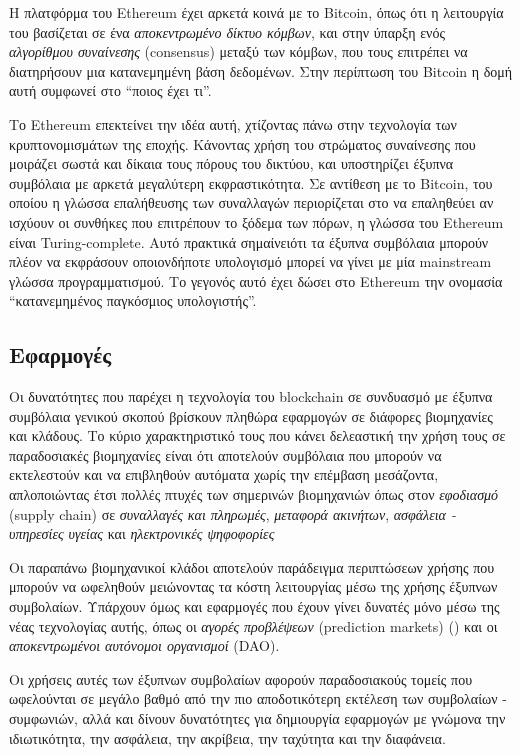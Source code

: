 Η πλατφόρμα του Ethereum έχει αρκετά κοινά με το Bitcoin, όπως ότι η λειτουργία
του βασίζεται σε ένα \textit{αποκεντρωμένο δίκτυο κόμβων}, και στην ύπαρξη ενός
\textit{αλγορίθμου συναίνεσης} (consensus) μεταξύ των κόμβων, που τους
επιτρέπει να διατηρήσουν μια κατανεμημένη βάση δεδομένων. Στην περίπτωση του
Bitcoin η δομή αυτή συμφωνεί στο ``ποιος έχει τι''.

Το Ethereum επεκτείνει την ιδέα αυτή, χτίζοντας πάνω στην τεχνολογία των
κρυπτονομισμάτων της εποχής.  Κάνοντας χρήση του στρώματος συναίνεσης που
μοιράζει σωστά και δίκαια τους πόρους του δικτύου, και υποστηρίζει έξυπνα
συμβόλαια με αρκετά μεγαλύτερη εκφραστικότητα. Σε αντίθεση με το Bitcoin, του
οποίου η γλώσσα επαλήθευσης των συναλλαγών περιορίζεται στο να επαληθεύει αν
ισχύουν οι συνθήκες που επιτρέπουν το ξόδεμα των πόρων, η γλώσσα του Ethereum
είναι Turing-complete. Αυτό πρακτικά σημαίνειότι τα έξυπνα συμβόλαια μπορούν
πλέον να εκφράσουν οποιονδήποτε υπολογισμό μπορεί να γίνει με μία mainstream
γλώσσα προγραμματισμού. Το γεγονός αυτό έχει δώσει στο Ethereum την ονομασία
``κατανεμημένος παγκόσμιος υπολογιστής''.

\subsection{Εφαρμογές}

Οι δυνατότητες που παρέχει η τεχνολογία του blockchain σε συνδυασμό με έξυπνα
συμβόλαια γενικού σκοπού βρίσκουν πληθώρα εφαρμογών σε διάφορες βιομηχανίες και
κλάδους. Το κύριο χαρακτηριστικό τους που κάνει δελεαστική την χρήση τους σε
παραδοσιακές βιομηχανίες είναι ότι αποτελούν συμβόλαια που μπορούν να
εκτελεστούν και να επιβληθούν αυτόματα χωρίς την επέμβαση μεσάζοντα,
απλοποιώντας έτσι πολλές πτυχές των σημερινών βιομηχανιών όπως στον
\textit{εφοδιασμό} (supply chain) σε \textit{συναλλαγές και πληρωμές},
\textit{μεταφορά ακινήτων}, \textit{ασφάλεια - υπηρεσίες υγείας} και
\textit{ηλεκτρονικές ψηφοφορίες}

Οι παραπάνω βιομηχανικοί κλάδοι αποτελούν παράδειγμα περιπτώσεων χρήσης που
μπορούν να ωφεληθούν μειώνοντας τα κόστη λειτουργίας μέσω της χρήσης έξυπνων
συμβολαίων. Υπάρχουν όμως και εφαρμογές που έχουν γίνει δυνατές μόνο μέσω της
νέας τεχνολογίας αυτής, όπως οι \emph{αγορές προβλέψεων} (prediction markets)
(\cite{augur}) και οι \emph{αποκεντρωμένοι αυτόνομοι οργανισμοί} (DAO).

Οι χρήσεις αυτές των έξυπνων συμβολαίων αφορούν παραδοσιακούς τομείς που
ωφελούνται σε μεγάλο βαθμό από την πιο αποδοτικότερη εκτέλεση των συμβολαίων -
συμφωνιών, αλλά και δίνουν δυνατότητες για δημιουργία εφαρμογών με γνώμονα την
ιδιωτικότητα, την ασφάλεια, την ακρίβεια, την ταχύτητα και την διαφάνεια.

